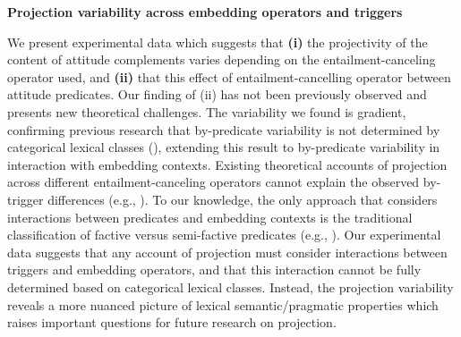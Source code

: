 \documentclass[12pt, letterpaper]{article}
\begin{document}


\begin{center}
	\textbf{\large%
		Projection variability across embedding operators and triggers}
\end{center}

\vspace{-.7\baselineskip}
\noindent 
	We present experimental data which suggests that \textbf{(i)} the projectivity of the content of attitude complements varies depending on the entailment-canceling operator used, and \textbf{(ii)} that this effect of entailment-cancelling operator between attitude predicates.
	Our finding of (ii) has not been previously observed and presents new theoretical challenges. The variability we found is gradient, confirming previous research that by-predicate variability is not determined by categorical lexical classes (\citealt{tonhauser_how_2018,degen_are_2022}), extending this result to by-predicate variability in interaction with embedding contexts.
	Existing theoretical accounts of projection across different entailment-canceling operators cannot explain the observed by-trigger differences (e.g.,
	\citealt{heim_projection_1983,van_der_sandt_presupposition_1992,abrusan_predicting_2011,schlenker_triggering_2021}).
	To our knowledge, the only approach that considers interactions between predicates and embedding contexts is the traditional classification of factive versus semi-factive predicates (e.g., \citealt{karttunen_observations_1971,hooper_applicability_1973,djarv_cognitive_2018}).
	Our experimental data suggests that any account of projection must consider interactions between triggers and embedding operators, and that this interaction cannot be fully determined based on categorical lexical classes. Instead, the projection variability reveals a more nuanced picture of lexical semantic/pragmatic properties which raises important questions for future research on projection.
	
\end{document}
